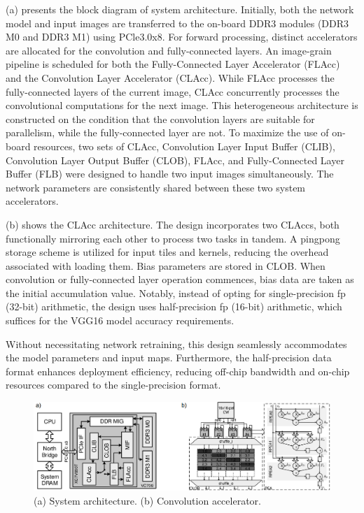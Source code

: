 (a) presents the block diagram of system architecture. Initially, both the network model and input images are transferred to the on-board DDR3 modules (DDR3 M0 and DDR3 M1) using PCle3.0x8. For forward processing, distinct accelerators are allocated for the convolution and fully-connected layers. An image-grain pipeline is scheduled for both the Fully-Connected Layer Accelerator (FLAcc) and the Convolution Layer Accelerator (CLAcc). While FLAcc processes the fully-connected layers of the current image, CLAcc concurrently processes the convolutional computations for the next image. This heterogeneous architecture is constructed on the condition that the convolution layers are suitable for parallelism, while the fully-connected layer are not. To maximize the use of on-board resources, two sets of CLAcc, Convolution Layer Input Buffer (CLIB), Convolution Layer Output Buffer (CLOB), FLAcc, and Fully-Connected Layer Buffer (FLB) were designed to handle two input images simultaneously. The network parameters are consistently shared between these two system accelerators.

(b) shows the CLAcc architecture. The design incorporates two CLAccs, both functionally mirroring each other to process two tasks in tandem. A pingpong storage scheme is utilized for input tiles and kernels, reducing the overhead associated with loading them. Bias parameters are stored in CLOB. When convolution or fully-connected layer operation commences, bias data are taken as the initial accumulation value. Notably, instead of opting for single-precision \gls{fp} (32-bit) arithmetic, the design uses half-precision \gls{fp} (16-bit) arithmetic, which suffices for the VGG16 model accuracy requirements.

Without necessitating network retraining, this design seamlessly accommodates the model parameters and input maps. Furthermore, the half-precision data format enhances deployment efficiency, reducing off-chip bandwidth and on-chip resources compared to the single-precision format.

\begin{figure}[h!]
	\centering
	\includegraphics[width=\textwidth]{./figures/1_g.png}
	\caption{(a) System architecture. (b) Convolution accelerator.}
	\label{fig:mei2017200mhz}
\end{figure}
\FloatBarrier

